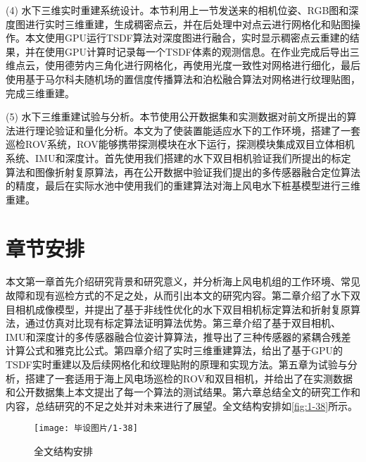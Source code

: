 (4) 水下三维实时重建系统设计。本节利用上一节发送来的相机位姿、RGB图和深度图进行实时三维重建，生成稠密点云，并在后处理中对点云进行网格化和贴图操作。本文使用GPU运行TSDF算法对深度图进行融合，实时显示稠密点云重建的结果，并在使用GPU计算时记录每一个TSDF体素的观测信息。在作业完成后导出三维点云，使用德劳内三角化进行网格化，再使用光度一致性对网格进行细化，最后使用基于马尔科夫随机场的置信度传播算法和泊松融合算法对网格进行纹理贴图，完成三维重建。

(5) 水下三维重建试验与分析。本节使用公开数据集和实测数据对前文所提出的算法进行理论验证和量化分析。本文为了使装置能适应水下的工作环境，搭建了一套巡检ROV系统，ROV能够携带探测模块在水下运行，探测模块集成双目立体相机系统、IMU和深度计。首先使用我们搭建的水下双目相机验证我们所提出的标定算法和图像折射复原算法，再在公开数据中验证我们提出的多传感器融合定位算法的精度，最后在实际水池中使用我们的重建算法对海上风电水下桩基模型进行三维重建。

\section{章节安排}
本文第一章首先介绍研究背景和研究意义，并分析海上风电机组的工作环境、常见故障和现有巡检方式的不足之处，从而引出本文的研究内容。第二章介绍了水下双目相机成像模型，并提出了基于非线性优化的水下双目相机标定算法和折射复原算法，通过仿真对比现有标定算法证明算法优势。第三章介绍了基于双目相机、IMU和深度计的多传感器融合位姿计算算法，推导出了三种传感器的紧耦合残差计算公式和雅克比公式。第四章介绍了实时三维重建算法，给出了基于GPU的TSDF实时重建以及后续网格化和纹理贴附的原理和实现方法。第五章为试验与分析，搭建了一套适用于海上风电场巡检的ROV和双目相机，并给出了在实测数据和公开数据集上本文提出了每一个算法的测试结果。第六章总结全文的研究工作和内容，总结研究的不足之处并对未来进行了展望。全文结构安排如\autoref{fig:1-38}所示。

\begin{figure}[htbp]
    \centering
    \texttt{[image: 毕设图片/1-38]}
    \caption{\label{fig:1-38}全文结构安排}
\end{figure}